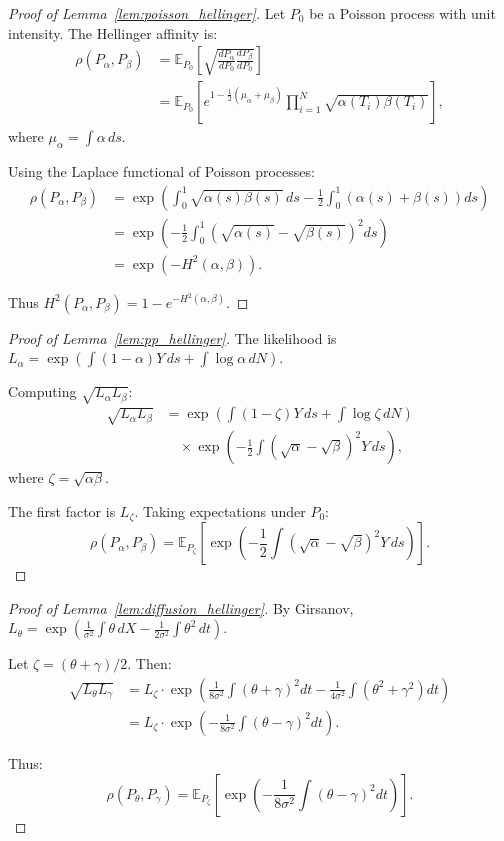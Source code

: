 \documentclass[preprint,review,12pt]{article}
\begin{document}
\begin{proof}[Proof of Lemma~\ref{lem:poisson_hellinger}]
Let $P_0$ be a Poisson process with unit intensity. The Hellinger affinity is:
\begin{align*}
	\rho(P_\alpha, P_\beta) &= \mathbb{E}_{P_0}\left[ \sqrt{\frac{dP_\alpha}{dP_0} 
		\frac{dP_\beta}{dP_0}} \right] \\
	&= \mathbb{E}_{P_0}\left[ e^{1 - \frac{1}{2}(\mu_\alpha + \mu_\beta)} 
	\prod_{i=1}^N \sqrt{\alpha(T_i)\beta(T_i)} \right],
\end{align*}
where $\mu_\alpha = \int \alpha \, ds$.

Using the Laplace functional of Poisson processes:
\begin{align*}
	\rho(P_\alpha, P_\beta) &= \exp\left( \int_0^1 \sqrt{\alpha(s)\beta(s)} \, ds 
	- \frac{1}{2} \int_0^1 (\alpha(s) + \beta(s)) ds \right) \\
	&= \exp\left( -\frac{1}{2} \int_0^1 (\sqrt{\alpha(s)} - \sqrt{\beta(s)})^2 ds \right) \\
	&= \exp(-H^2(\alpha, \beta)).
\end{align*}

Thus $H^2(P_\alpha, P_\beta) = 1 - e^{-H^2(\alpha, \beta)}$.
\end{proof}

\begin{proof}[Proof of Lemma~\ref{lem:pp_hellinger}]
The likelihood is $L_\alpha = \exp(\int (1-\alpha) Y \, ds + \int \log \alpha \, dN)$.

Computing $\sqrt{L_\alpha L_\beta}$:
\begin{align*}
	\sqrt{L_\alpha L_\beta} &= \exp\left( \int (1 - \zeta) Y \, ds + \int \log \zeta \, dN \right) \\
	&\quad \times \exp\left( -\frac{1}{2} \int (\sqrt{\alpha} - \sqrt{\beta})^2 Y \, ds \right),
\end{align*}
where $\zeta = \sqrt{\alpha\beta}$.

The first factor is $L_\zeta$. Taking expectations under $P_0$:
\[
\rho(P_\alpha, P_\beta) = \mathbb{E}_{P_\zeta}\left[ 
\exp\left( -\frac{1}{2} \int (\sqrt{\alpha} - \sqrt{\beta})^2 Y \, ds \right) \right].
\]
\end{proof}

\begin{proof}[Proof of Lemma~\ref{lem:diffusion_hellinger}]
By Girsanov, $L_\theta = \exp(\frac{1}{\sigma^2} \int \theta \, dX - \frac{1}{2\sigma^2} \int \theta^2 \, dt)$.

Let $\zeta = (\theta + \gamma)/2$. Then:
\begin{align*}
	\sqrt{L_\theta L_\gamma} &= L_\zeta \cdot \exp\left( \frac{1}{8\sigma^2} \int (\theta + \gamma)^2 dt 
	- \frac{1}{4\sigma^2} \int (\theta^2 + \gamma^2) dt \right) \\
	&= L_\zeta \cdot \exp\left( -\frac{1}{8\sigma^2} \int (\theta - \gamma)^2 dt \right).
\end{align*}

Thus:
\[
\rho(P_\theta, P_\gamma) = \mathbb{E}_{P_\zeta}\left[ 
\exp\left( -\frac{1}{8\sigma^2} \int (\theta - \gamma)^2 dt \right) \right].
\]
\end{proof}
\end{document}
